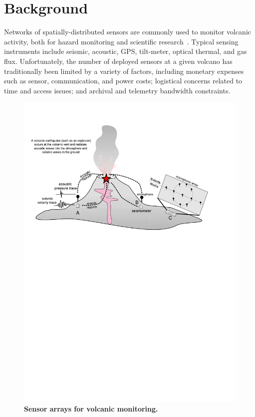 \section{Background}
\label{sec-background}

Networks of spatially-distributed sensors are commonly used to
monitor volcanic activity, both for hazard monitoring and scientific
research~\cite{Scarpa96}.  Typical sensing instruments include
seismic, acoustic, GPS, tilt-meter, optical thermal, and gas
flux. Unfortunately, the number of deployed sensors
at a given volcano has traditionally been limited by a variety of factors,
including monetary expenses such as sensor, communication, and power costs;
logistical concerns related to time and access issues; and archival and
telemetry bandwidth constraints.

\begin{figure}[t]
\begin{center}
\includegraphics[width=0.9\hsize,clip=true,bb=20 470 540 770]{./figures/Cartoon2.pdf}
\end{center}
\caption{\small {\bf Sensor arrays for volcanic monitoring.}}
\label{fig-cartoon}
\end{figure}


